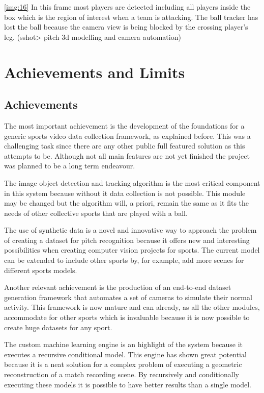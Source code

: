 \documentclass[
11pt,
twoside
]{report}
\begin{document}
\ref{img:16} In this
frame most players are detected including all players inside the box which is the region of interest when a team is attacking. The ball tracker has lost the ball because the camera view is being blocked by the crossing player's leg. (sshot\textgreater{} pitch 3d modelling and camera automation)





\section{Achievements and Limits}

\subsection{Achievements}


The most important achievement is the development of the foundations for a generic sports video data collection framework, as explained before. This was a challenging task since there are any other public full featured solution as this attempts to be. Although not all main features are not yet finished the project was planned to be a long term endeavour.


The image object detection and tracking algorithm is the most critical component in this system because without it data collection is not possible. This module may be changed but the algorithm will, a priori, remain the same as it fits the needs of other collective sports that are played with a ball.


The use of synthetic data is a novel and innovative way to approach the problem of creating a dataset for pitch recognition because it offers new and interesting possibilities when creating computer vision projects for sports. The current model can be extended to include other sports by, for example, add more scenes for different sports models.


Another relevant achievement is the production of an end-to-end dataset generation framework that automates a set of cameras to simulate their normal activity. This framework is now mature and can already, as all the other modules, accommodate for other sports which is invaluable because it is now possible to create huge datasets for any sport.


The custom machine learning engine is an highlight of the system because it executes a recursive conditional model. This engine has shown great potential because it is a neat solution for a complex problem of executing a geometric reconstruction of a match recording scene. By recursively and conditionally executing these models it is possible to have better results than a single model.
\end{document}
